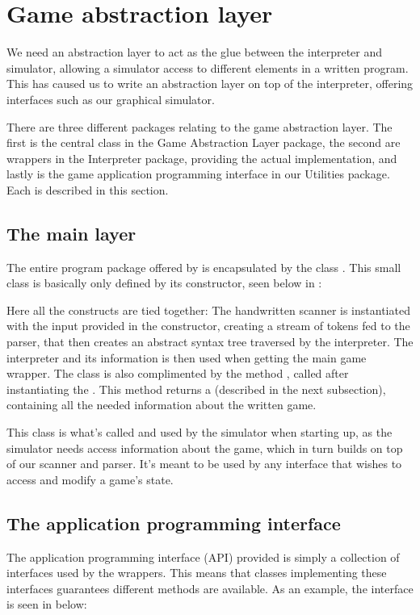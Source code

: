 \section{Game abstraction layer}
\label{sec:gameabstractionlayer}
We need an abstraction layer to act as the glue between the interpreter
and simulator, allowing a simulator access to different elements in a
written program. This has caused us to write an abstraction layer on top
of the interpreter, offering interfaces such as our graphical simulator.

There are three different packages relating to the game abstraction
layer. The first is the central class in the Game Abstraction Layer
package, the second are wrappers in the Interpreter package, providing
the actual implementation, and lastly is the game application
programming interface in our Utilities package. Each is described in
this section.

\subsection{The main layer}
The entire program package offered by \productname{} is encapsulated by
the class . This small class is basically
only defined by its constructor, seen below in :



Here all the constructs are tied together: The handwritten scanner
is instantiated with the input provided in the constructor, creating
a stream of tokens fed to the parser, that then creates an abstract
syntax tree traversed by the interpreter. The interpreter and its
information is then used when getting the main game wrapper. The class
is also complimented by the method , called after
instantiating the . This method returns a
 (described in the next subsection), containing
all the needed information about the written game.

This class is what's called and used by the simulator when starting up,
as the simulator needs access information about the game, which in turn
builds on top of our scanner and parser. It's meant to be used by any
interface that wishes to access and modify a game's state.

\subsection{The application programming interface}
The application programming interface (API) provided is simply a collection of interfaces used by the wrappers. This means that classes implementing these interfaces guarantees different methods are available. As an example, the  interface is seen in  below:

